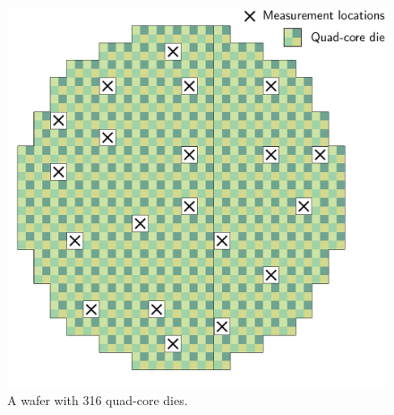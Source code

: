 \begin{figure}[t!]
  \centering
  \includegraphics[width=0.6\linewidth]{include/assets/wafer-pick.pdf}
  \caption{A wafer with 316 quad-core dies.}
  \vspace{-1.5em}
\end{figure}
